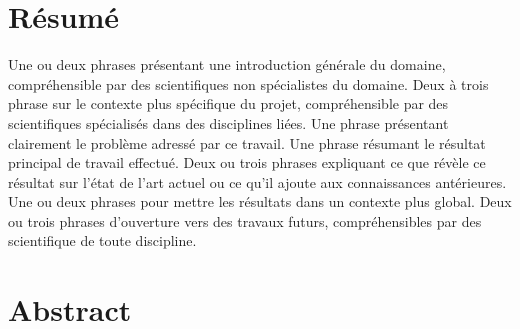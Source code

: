 \newpage
\section*{\Large \center Résumé}

Une ou deux phrases présentant une introduction générale du domaine, compréhensible par des scientifiques non spécialistes du domaine.
Deux à trois phrase sur le contexte plus spécifique du projet, compréhensible par des scientifiques spécialisés dans des disciplines liées.
Une phrase présentant clairement le problème adressé par ce travail.
Une phrase résumant le résultat principal de travail effectué.
Deux ou trois phrases expliquant ce que révèle ce résultat sur l'état de l'art actuel ou ce qu'il ajoute aux connaissances antérieures.
Une ou deux phrases pour mettre les résultats dans un contexte plus global.
Deux ou trois phrases d'ouverture vers des travaux futurs, compréhensibles par des scientifique de toute discipline.


\section*{\Large \center Abstract}
\lipsum

\newpage